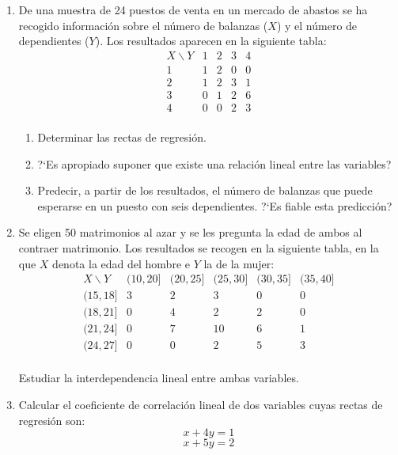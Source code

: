 \documentclass[11pt]{book}
\begin{document}
\begin{enumerate}
\item De una muestra de 24 puestos de  venta en  un  mercado  de
abastos  se ha recogido informaci\'on sobre el n\'umero de balanzas ($X$) y el n\'umero de dependientes ($Y$). Los resultados aparecen en la siguiente tabla:
$$
    \begin{array}{c|cccc}
        X \backslash Y & 1  &  2 &  3 & 4\\ \hline
           1  &  1 &  2 &  0 & 0 \\
           2  &  1 &  2 &  3 & 1 \\
           3  &  0 &  1 &  2 & 6 \\
           4  &  0 &  0 &  2 & 3 \\
    \end{array}
$$
  \begin{enumerate}
     \item Determinar las rectas de regresi{\'o}n.
     \item ?`Es apropiado suponer que existe una relaci{\'o}n  lineal  entre  las
           variables?
     \item  Predecir, a partir de los resultados, el n\'umero de balanzas que puede esperarse en un puesto con seis dependientes.  ?`Es fiable esta predicci{\'o}n?
  \end{enumerate}

\item Se eligen  50 matrimonios al azar  y se les pregunta  la  edad de
ambos al contraer matrimonio. Los resultados se recogen en la  siguiente tabla, en la que $X$
denota la edad del hombre e $Y$ la de la mujer:
$$
    \begin{array}{c|ccccc}
         X  \backslash  Y & (10,20] & (20,25] & (25,30] & (30,35] & (35,40] \\ \hline
          (15,18]  &   3   &   2   &   3   &   0   &   0   \\
          (18,21]  &   0   &   4   &   2   &   2   &   0   \\
          (21,24]  &   0   &   7   &   10  &   6   &   1   \\
          (24,27]  &   0   &   0   &   2   &   5   &   3    \\
    \end{array}
$$

   Estudiar la interdependencia lineal entre ambas variables.



\item Calcular el coeficiente de correlaci\'on lineal de dos variables cuyas rectas de regresi\'on son:
$$
x + 4y = 1
$$
$$
x + 5y = 2
$$





\end{enumerate}
\end{document}
